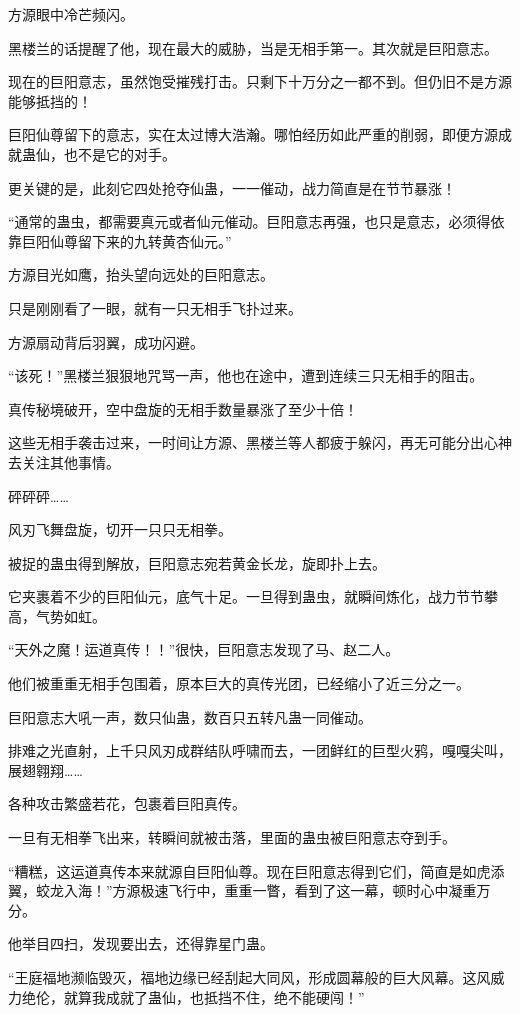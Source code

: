 \begin{this_body}
方源眼中冷芒频闪。

黑楼兰的话提醒了他，现在最大的威胁，当是无相手第一。其次就是巨阳意志。

现在的巨阳意志，虽然饱受摧残打击。只剩下十万分之一都不到。但仍旧不是方源能够抵挡的！

巨阳仙尊留下的意志，实在太过博大浩瀚。哪怕经历如此严重的削弱，即便方源成就蛊仙，也不是它的对手。

更关键的是，此刻它四处抢夺仙蛊，一一催动，战力简直是在节节暴涨！

“通常的蛊虫，都需要真元或者仙元催动。巨阳意志再强，也只是意志，必须得依靠巨阳仙尊留下来的九转黄杏仙元。”

方源目光如鹰，抬头望向远处的巨阳意志。

只是刚刚看了一眼，就有一只无相手飞扑过来。

方源扇动背后羽翼，成功闪避。

“该死！”黑楼兰狠狠地咒骂一声，他也在途中，遭到连续三只无相手的阻击。

真传秘境破开，空中盘旋的无相手数量暴涨了至少十倍！

这些无相手袭击过来，一时间让方源、黑楼兰等人都疲于躲闪，再无可能分出心神去关注其他事情。

砰砰砰……

风刃飞舞盘旋，切开一只只无相拳。

被捉的蛊虫得到解放，巨阳意志宛若黄金长龙，旋即扑上去。

它夹裹着不少的巨阳仙元，底气十足。一旦得到蛊虫，就瞬间炼化，战力节节攀高，气势如虹。

“天外之魔！运道真传！！”很快，巨阳意志发现了马、赵二人。

他们被重重无相手包围着，原本巨大的真传光团，已经缩小了近三分之一。

巨阳意志大吼一声，数只仙蛊，数百只五转凡蛊一同催动。

排难之光直射，上千只风刃成群结队呼啸而去，一团鲜红的巨型火鸦，嘎嘎尖叫，展翅翱翔……

各种攻击繁盛若花，包裹着巨阳真传。

一旦有无相拳飞出来，转瞬间就被击落，里面的蛊虫被巨阳意志夺到手。

“糟糕，这运道真传本来就源自巨阳仙尊。现在巨阳意志得到它们，简直是如虎添翼，蛟龙入海！”方源极速飞行中，重重一瞥，看到了这一幕，顿时心中凝重万分。

他举目四扫，发现要出去，还得靠星门蛊。

“王庭福地濒临毁灭，福地边缘已经刮起大同风，形成圆幕般的巨大风幕。这风威力绝伦，就算我成就了蛊仙，也抵挡不住，绝不能硬闯！”

\end{this_body}

